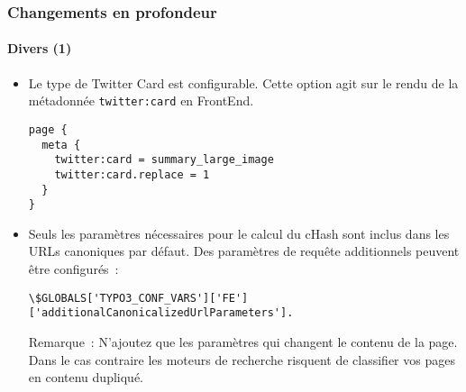 
\begin{frame}[fragile]
	\frametitle{Changements en profondeur}
	\framesubtitle{Divers (1)}

	\lstset{basicstyle=\tiny\ttfamily}

	\begin{itemize}

		\item Le type de Twitter Card est configurable.
			Cette option agit sur le rendu de la métadonnée \texttt{twitter:card} en FrontEnd.
\begin{lstlisting}
page {
  meta {
    twitter:card = summary_large_image
    twitter:card.replace = 1
  }
}
\end{lstlisting}

		\item Seuls les paramètres nécessaires pour le calcul du cHash sont inclus dans les URLs canoniques par défaut.
			Des paramètres de requête additionnels peuvent être configurés~:
\begin{lstlisting}
\$GLOBALS['TYPO3_CONF_VARS']['FE']['additionalCanonicalizedUrlParameters'].
\end{lstlisting}

		\smaller
			Remarque~: N'ajoutez que les paramètres qui changent le contenu de la page. Dans le cas contraire les
			moteurs de recherche risquent de classifier vos pages en contenu dupliqué.
		\normalsize

	\end{itemize}

\end{frame}


